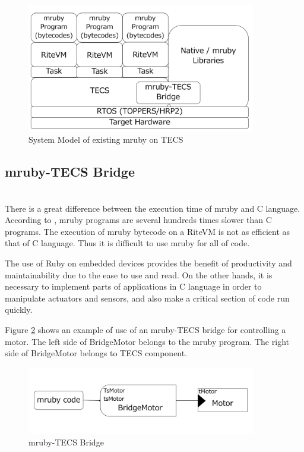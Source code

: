 \documentclass[a4j,12pt,oneside,openany,english]{jsbook}
\begin{document}
\begin{figure}[t]
    \centering
    \includegraphics[width=10cm,clip]{../EMSOFT2016/figure/mrubyontecs.pdf}
    \caption{System Model of existing mruby on TECS}
    \label{fig:mrubyontecs}
\end{figure}

\subsection{mruby-TECS Bridge}\mbox{}\\

There is a great difference between the execution time of mruby and C language.
According to  \cite{par:mrubyonTECS}, mruby programs are several hundreds times slower than C programs.
The execution of mruby bytecode on a RiteVM is not as efficient as that of C language.
Thus it is difficult to use mruby for all of code.

The use of Ruby on embedded devices provides the benefit of productivity and maintainability due to the ease to use and read.
On the other hands, it is necessary to implement parts of applications in C language in order to manipulate actuators and sensors, and also make a critical section of code run quickly.

Figure \ref{fig:mruby_TECS_bridge} shows an example of use of an mruby-TECS bridge for controlling a motor.
The left side of BridgeMotor belongs to the mruby program.
The right side of BridgeMotor belongs to TECS component.
\begin{figure}[t]
    \centering
    \includegraphics[width=10cm,clip]{../EMSOFT2016/figure/mruby_TECS_bridge.pdf}
    \caption{mruby-TECS Bridge}
    \label{fig:mruby_TECS_bridge}
\end{figure}
\end{document}
